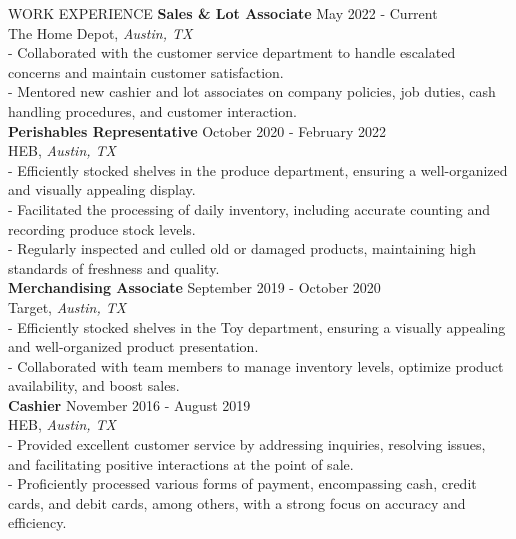 \documentclass{résumé} %
\begin{document}
\begin{rSection}{WORK EXPERIENCE}
\textbf{Sales \& Lot Associate} \hfill May 2022 - Current \\ The Home Depot, \textit{Austin, TX} \\
- Collaborated with the customer service department to handle escalated concerns and maintain customer satisfaction. \\
- Mentored new cashier and lot associates on company policies, job duties, cash handling procedures, and customer interaction. \\ 
\textbf{Perishables Representative} \hfill October 2020 - February 2022 \\ HEB, \textit{Austin, TX} \\
- Efficiently stocked shelves in the produce department, ensuring a well-organized and visually appealing display. \\
- Facilitated the processing of daily inventory, including accurate counting and recording produce stock levels. \\
- Regularly inspected and culled old or damaged products, maintaining high standards of freshness and quality. \\
\textbf{Merchandising Associate} \hfill September 2019 - October 2020 \\ Target, \textit{Austin, TX} \\
- Efficiently stocked shelves in the Toy department, ensuring a visually appealing and well-organized product presentation. \\
- Collaborated with team members to manage inventory levels, optimize product availability, and boost sales. \\
\textbf{Cashier} \hfill November 2016 - August 2019 \\ HEB, \textit{Austin, TX} \\
- Provided excellent customer service by addressing inquiries, resolving issues, and facilitating positive interactions at the point of sale. \\
- Proficiently processed various forms of payment, encompassing cash, credit cards, and debit cards, among others, with a strong focus on accuracy and efficiency.
\end{rSection} 
\end{document}
